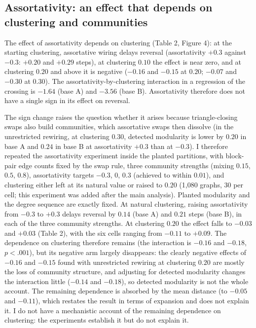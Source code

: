 \documentclass{nws}
\begin{document}
\subsection{Assortativity: an effect that depends on clustering and communities}

The effect of assortativity depends on clustering (Table 2, Figure 4): at the starting
clustering, assortative wiring delays reversal (assortativity $+0.3$ against $-0.3$:
$+0.20$ and $+0.29$ steps), at clustering $0.10$ the effect is near zero, and at
clustering $0.20$ and above it is negative ($-0.16$ and $-0.15$ at $0.20$; $-0.07$
and $-0.30$ at $0.30$). The assortativity-by-clustering interaction in a regression
of the crossing is $-1.64$ (base A) and $-3.56$ (base B). Assortativity therefore
does not have a single sign in its effect on reversal.

The sign change raises the question whether it arises because triangle-closing swaps also build communities, which assortative swaps then dissolve (in the unrestricted rewiring, at clustering $0.30$, detected modularity is lower by $0.20$ in base A and $0.24$ in base B at assortativity $+0.3$ than at $-0.3$). I therefore repeated the assortativity experiment inside the planted partitions, with block-pair edge counts fixed by the swap rule, three community strengths (mixing $0.15$, $0.5$, $0.8$), assortativity targets $-0.3$, $0$, $0.3$ (achieved to within $0.01$), and clustering either left at its natural value or raised to $0.20$ (1{,}080 graphs, 30 per cell; this experiment was added after the main analysis). Planted modularity and the degree sequence are exactly fixed. At natural clustering, raising assortativity from $-0.3$ to $+0.3$ delays reversal by $0.14$ (base A) and $0.21$ steps (base B), in each of the three community strengths. At clustering $0.20$ the effect falls to $-0.03$ and $+0.03$ (Table 2), with the six cells ranging from $-0.11$ to $+0.09$. The dependence on clustering therefore remains (the interaction is $-0.16$ and $-0.18$, $p<.001$), but its negative arm largely disappears: the clearly negative effects of $-0.16$ and $-0.15$ found with unrestricted rewiring at clustering $0.20$ are mostly the loss of community structure, and adjusting for detected modularity changes the interaction little ($-0.14$ and $-0.18$), so detected modularity is not the whole account. The remaining dependence is absorbed by the mean distance (to $-0.05$ and $-0.11$), which restates the result in terms of expansion and does not explain it. I do not have a mechanistic account of the remaining dependence on clustering: the experiments establish it but do not explain it.
\end{document}
